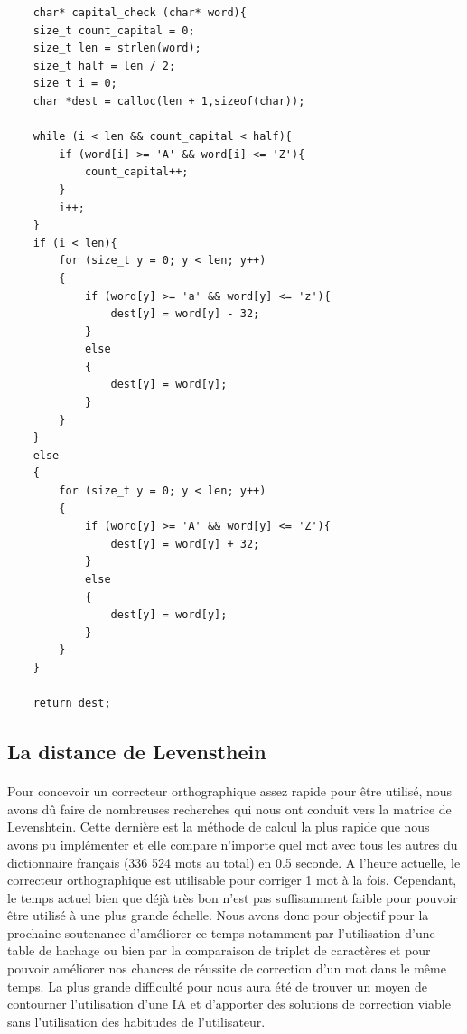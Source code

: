 \documentclass{article}
\begin{document}
\begin{lstlisting}
	char* capital_check (char* word){
    size_t count_capital = 0;
    size_t len = strlen(word);
    size_t half = len / 2;
    size_t i = 0;
    char *dest = calloc(len + 1,sizeof(char));

    while (i < len && count_capital < half){
        if (word[i] >= 'A' && word[i] <= 'Z'){
            count_capital++;
        }
        i++;
    }
    if (i < len){
        for (size_t y = 0; y < len; y++)
        {
            if (word[y] >= 'a' && word[y] <= 'z'){
                dest[y] = word[y] - 32;
            }
            else
            {
                dest[y] = word[y];
            }
        }
    }
    else
    {
        for (size_t y = 0; y < len; y++)
        {
            if (word[y] >= 'A' && word[y] <= 'Z'){
                dest[y] = word[y] + 32;
            }
            else
            {
                dest[y] = word[y];
            }
        }
    }

    return dest;
\end{lstlisting}

\subsection{La distance de Levensthein}
\paragraph{}Pour concevoir un correcteur orthographique assez rapide pour être utilisé, nous avons dû faire de nombreuses recherches qui nous ont conduit vers la matrice de Levenshtein. Cette dernière est la méthode de calcul la plus rapide que nous avons pu implémenter et elle compare n’importe quel mot avec tous les autres du dictionnaire français (336 524 mots au total) en 0.5 seconde. A l'heure actuelle, le correcteur orthographique est utilisable pour corriger 1 mot à la fois. Cependant, le temps actuel bien que déjà très bon n’est pas suffisamment faible pour pouvoir être utilisé à une plus grande échelle. Nous avons donc pour objectif pour la prochaine soutenance d’améliorer ce temps notamment par l’utilisation d’une table de hachage ou bien par la comparaison de triplet de caractères et pour pouvoir améliorer nos chances de réussite de correction d’un mot dans le même temps. La plus grande difficulté pour nous aura été de trouver un moyen de contourner l'utilisation d'une IA et d’apporter des solutions de correction viable sans l’utilisation des habitudes de l’utilisateur.
\end{document}
